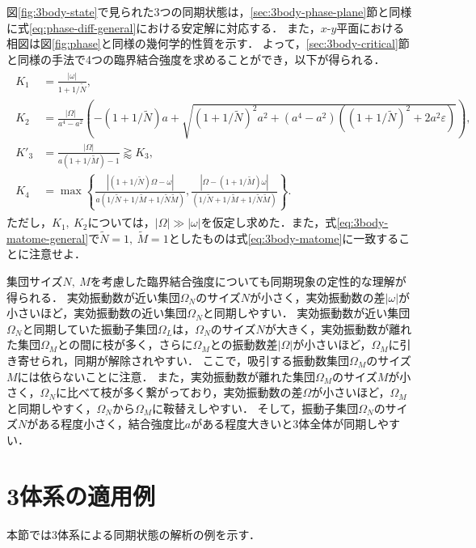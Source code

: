 \documentclass[../main]{subfiles}
\begin{document}
図\ref{fig:3body-state}で見られた3つの同期状態は，\ref{sec:3body-phase-plane}節と同様に式\eqref{eq:phase-diff-general}における安定解に対応する．
また，$x$-$y$平面における相図は図\ref{fig:phase}と同様の幾何学的性質を示す．
よって，\ref{sec:3body-critical}節と同様の手法で4つの臨界結合強度を求めることができ，以下が得られる．
\begin{align}
    \label{eq:3body-matome-general}
    \begin{split}
        K_1&=\frac{|\omega|}{1+1/\tilde{N}},\\
        K_2&=\frac{|\Omega|}{a^4-a^2}\left(-\left( 1+1/\tilde{N} \right)a+\sqrt{\left( 1+1/\tilde{N} \right)^2a^2+(a^4-a^2)\left(\left( 1+1/\tilde{N} \right)^2+2a^2\varepsilon\right)}\right),\\
        K'_3&=\frac{|\Omega|}{a(1+1/\tilde{M})-1}\gtrapprox K_3,\\
        K_4&=\max\left\{\frac{|(1+1/\tilde{N})\Omega-\omega|}{a(1/\tilde{N}+1/\tilde{M}+1/\tilde{N}\tilde{M})},\frac{|\Omega-(1+1/\tilde{M})\omega|}{(1/\tilde{N}+1/\tilde{M}+1/\tilde{N}\tilde{M})}\right\}.
    \end{split}
\end{align}
ただし，$K_1,\ K_2$については，$|\Omega|\gg|\omega|$を仮定し求めた．また，式\eqref{eq:3body-matome-general}で$\tilde{N}=1,\ \tilde{M}=1$としたものは式\eqref{eq:3body-matome}に一致することに注意せよ．

集団サイズ$N,\ M$を考慮した臨界結合強度についても同期現象の定性的な理解が得られる．
実効振動数が近い集団$\Omega_N$のサイズ$N$が小さく，実効振動数の差$|\omega|$が小さいほど，実効振動数の近い集団$\Omega_N$と同期しやすい．
実効振動数が近い集団$\Omega_N$と同期していた振動子集団$\Omega_L$は，$\Omega_N$のサイズ$N$が大きく，実効振動数が離れた集団$\Omega_M$との間に枝が多く，さらに$\Omega_M$との振動数差$|\Omega|$が小さいほど，$\Omega_M$に引き寄せられ，同期が解除されやすい．
ここで，吸引する振動数集団$\Omega_M$のサイズ$M$には依らないことに注意．
また，実効振動数が離れた集団$\Omega_M$のサイズ$M$が小さく，$\Omega_N$に比べて枝が多く繋がっており，実効振動数の差$\Omega$が小さいほど，$\Omega_M$と同期しやすく，$\Omega_N$から$\Omega_M$に鞍替えしやすい．
そして，振動子集団$\Omega_N$のサイズ$N$がある程度小さく，結合強度比$a$がある程度大きいと3体全体が同期しやすい．

\section{3体系の適用例}
本節では3体系による同期状態の解析の例を示す．
\end{document}
